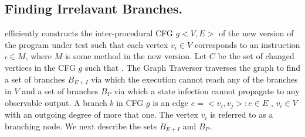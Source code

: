 %

\subsection{Finding Irrelavant Branches.}
 efficiently constructs the inter-procedural CFG $g<$$V,E$$>$ of 
the new version of the program under test such that each vertex $v_i \in V$ 
corresponds to an instruction $\iota \in M$, where $M$ is some method in the new version.  
Let $C$ be the set of changed vertices in the CFG $g$ such that  . The Graph Traverser traverses the graph to find a set of branches $B_{E+I}$ via which the execution cannot reach any of the branches in $V$ and a set of branches $B_{P}$ via which a state infection cannot propagate to any observable output. A branch $b$ in CFG $g$ is an edge $e = <$$v_i, v_j$$>: e \in E$ , $v_i \in V$ with an outgoing degree of more that one. The vertex $v_i$ is referred to as a branching node. 
We next describe the sets $B_{E+I}$ and $B_P$.

